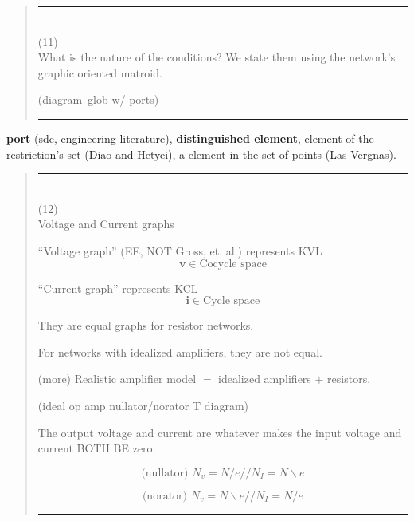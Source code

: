 \documentclass{article}
\begin{document}
\pagebreak[3] \begin{quote}\rule{\textwidth}{3pt}\\
(11)\\
What is the nature of the conditions?  We state them using the 
network's graphic oriented matroid.

(diagram--glob w/ ports)

\rule{\textwidth}{3pt}
\end{quote}

\textbf{port} (sdc, engineering literature), 
\textbf{distinguished element}, 
element of the restriction's set (Diao and Hetyei), 
a element in the set of points (Las Vergnas).


\pagebreak[3] \begin{quote}\rule{\textwidth}{3pt}\\
(12)\\
Voltage and Current graphs



\begin{minipage}{0.4\textwidth}
``Voltage graph'' (EE, NOT Gross, et. al.) represents KVL
\[\mathbf{v}\in \text{Cocycle space}\]
\end{minipage}
\begin{minipage}{0.4\textwidth}
``Current graph'' represents KCL
\[\mathbf{i}\in \text{Cycle space}\]
\end{minipage}
They are equal graphs for resistor networks.

For networks with idealized amplifiers, they are not 
equal.  

(more) Realistic amplifier model $=$ idealized amplifiers $+$ 
resistors.

(ideal op amp nullator/norator T diagram)

The output voltage and current are whatever makes the input
voltage and current BOTH BE zero.

\begin{minipage}{0.4\textwidth}
\[
\text{(nullator)\ }N_v = N/e// 
N_I = N\backslash e
\]
\end{minipage}
\begin{minipage}{0.4\textwidth}
\[
\text{(norator)\ }N_v = N\backslash e// 
N_I = N/e
\]
\end{minipage}



\rule{\textwidth}{3pt}
\end{quote}
\end{document}

